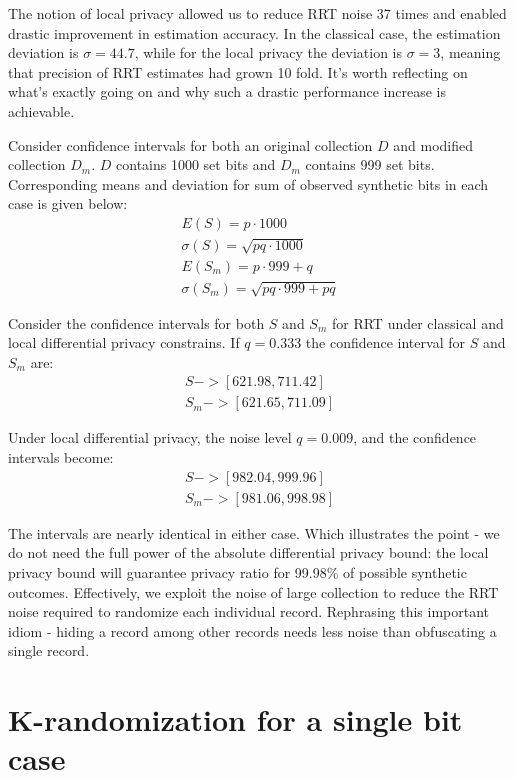 \documentclass[11pt,draft]{article}
\begin{document}
The notion of local privacy allowed us to reduce RRT noise 37 times and enabled drastic improvement in estimation accuracy.  In the classical case, the estimation deviation is $\sigma =  44.7$, while for the local privacy the deviation is $\sigma =  3$, meaning that precision of RRT estimates had grown 10 fold.  It's worth reflecting on what's  exactly going on and why such a drastic performance increase is achievable. 

Consider confidence intervals for both an original collection $D$  and modified collection $D_m$.  $D$ contains 1000 set bits and $D_m$ contains 999 set bits.  Corresponding means and deviation for sum of observed synthetic bits in each case is given below:
\begin{align}
E(S) = p \cdot 1000 \\
\sigma(S) = \sqrt{pq\cdot 1000} \\
E(S_m) = p \cdot 999 + q \\
\sigma(S_m) = \sqrt{pq\cdot 999 + pq}
\end{align}

Consider the confidence intervals for both $S$ and $S_m$ for RRT under classical and local differential privacy constrains.  If $q=0.333$ the confidence interval for $S$ and $S_m$  are:
\begin{align}
S -> [621.98 , 711.42] \\
S_m -> [621.65 , 711.09]
\end{align}

Under local differential privacy, the noise level $q= 0.009$, and the confidence intervals become:
\begin{align}
S -> [982.04 , 999.96] \\
S_m -> [981.06 , 998.98]
\end{align}

The intervals are nearly identical in either case.  Which illustrates the point - we do not need the full power of the absolute differential privacy bound: the local privacy bound will guarantee privacy ratio for 99.98\% of possible synthetic outcomes.  Effectively, we exploit the noise of large collection to reduce the RRT noise required to randomize each individual record.  Rephrasing this important idiom - hiding a record among other records needs less noise than obfuscating a single record.


\section{K-randomization for a single bit case}
\end{document}
